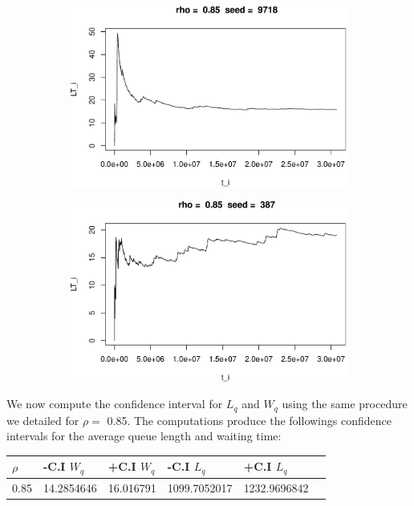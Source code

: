\documentclass[]{article}
\begin{document}
\begin{figure}[h!]
\begin{subfigure}[b]{.55\linewidth}
\includegraphics[width=\linewidth]{003_files/figure-latex/unnamed-chunk-20-9.pdf}
\end{subfigure}\hfill
\begin{subfigure}[b]{.55\linewidth}
\includegraphics[width=\linewidth]{003_files/figure-latex/unnamed-chunk-20-10.pdf}
\end{subfigure}\vfill
\end{figure}





We now compute the confidence interval for \(L_{q}\) and \(W_{q}\) using
the same procedure we detailed for \(\rho =\) 0.85. The computations
produce the followings confidence intervals for the average queue length
and waiting time:

\begin{longtable}[]{@{}llllll@{}}
\toprule
\(\rho\) & -C.I \(W_{q}\) & +C.I \(W_{q}\) & -C.I \(L_{q}\) & +C.I
\(L_{q}\) &\tabularnewline
\midrule
\endhead
0.85 & 14.2854646 & 16.016791 & 1099.7052017 &
1232.9696842\tabularnewline
\bottomrule
\end{longtable}
\end{document}
